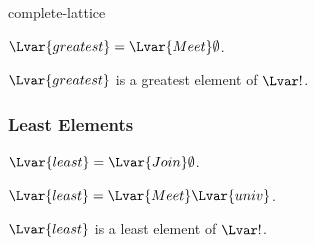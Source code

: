 \documentclass{stex}
\begin{document}
\begin{smodule}{complete-lattice}
\begin{forthel}
    \begin{proposition*}
      ${\Lvar{greatest}} = {\Lvar{Meet}} \emptyset$.
    \end{proposition*}

    \begin{proposition*}
      ${\Lvar{greatest}}$ is a greatest element of $\Lvar!$.
    \end{proposition*}
  \end{forthel}

  \subsubsection{Least Elements}

  \begin{forthel}
    \begin{definition*}
      ${\Lvar{least}} = {\Lvar{Join}} \emptyset$.
    \end{definition*}

    \begin{proposition*}
      ${\Lvar{least}} = {\Lvar{Meet}} \Lvar{univ}$.
    \end{proposition*}

    \begin{proposition*}
      ${\Lvar{least}}$ is a least element of $\Lvar!$.
    \end{proposition*}
  \end{forthel}
\end{smodule}
\end{document}
